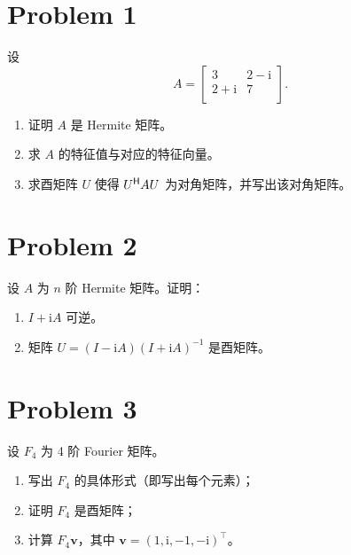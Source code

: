 \section*{Problem 1}

设 \[A = \begin{bmatrix}
    3 & 2 - \mathrm{i} \\
    2 + \mathrm{i} & 7 \\
\end{bmatrix}.\]

\begin{enumerate}
    \item 证明 $A$ 是 Hermite 矩阵。
    \item 求 $A$ 的特征值与对应的特征向量。
    \item 求酉矩阵 $U$ 使得 $U^{\mathsf{H}} AU$ 为对角矩阵，并写出该对角矩阵。
\end{enumerate}

\section*{Problem 2}

设 $A$ 为 $n$ 阶 Hermite 矩阵。证明：
\begin{enumerate}
    \item $I + \mathrm{i}A$ 可逆。
    \item 矩阵 $U = (I - \mathrm{i}A)(I + \mathrm{i}A)^{-1}$ 是酉矩阵。
\end{enumerate}

\section*{Problem 3}

设 $F_4$ 为 4 阶 Fourier 矩阵。

\begin{enumerate}
    \item 写出 $F_4$ 的具体形式（即写出每个元素）；
    \item 证明 $F_4$ 是酉矩阵；
    \item 计算 $F_4\bm{v}$，其中 $\bm{v} = (1, \mathrm{i}, -1, -\mathrm{i})^\top$。
\end{enumerate}
